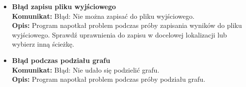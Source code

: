 \documentclass{article}
\begin{document}
\begin{itemize}
    \item \textbf{Błąd zapisu pliku wyjściowego} \\
    \textbf{Komunikat:} Błąd: Nie można zapisać do pliku wyjściowego. \\
    \textbf{Opis:} Program napotkał problem podczas próby zapisania wyników do pliku wyjściowego. Sprawdź uprawnienia do zapisu w docelowej lokalizacji lub wybierz inną ścieżkę.

    \item \textbf{Błąd podczas podziału grafu} \\
    \textbf{Komunikat:} Błąd: Nie udało się podzielić grafu. \\
    \textbf{Opis:} Program napotkał problem podczas próby podziału grafu.
\end{itemize}
\end{document}
